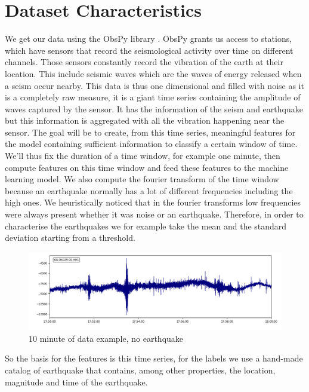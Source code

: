 \documentclass[10pt,conference,compsocconf]{IEEEtran}
\begin{document}
\section{Dataset Characteristics}
We get our data using the ObsPy library \cite{obspy}. ObsPy grants us access to stations, which have sensors that record the seismological activity over time on different channels. Those sensors constantly record  the vibration of the earth at their location. This include seismic waves which are the waves of energy released when a seism occur nearby. This data is thus one dimensional and filled with noise as it is a completely raw measure, it is a giant time series containing the amplitude of waves captured by the sensor. It has the information of the seism and earthquake but this information is aggregated with all the vibration happening near the sensor. The goal will be to create, from this time series, meaningful features for the model containing sufficient information to classify a certain window of time. We'll thus fix the duration of a time window, for example one minute, then compute features on this time window and feed these features to the machine learning model. We also compute the fourier transform of the time window because an earthquake normally has a lot of different frequencies including the high ones. We heuristically noticed that in the fourier transforms low frequencies were always present whether it was noise or an earthquake. Therefore, in order to characterise the earthquakes we for example take the mean and the standard deviation starting from a threshold.

\begin{figure}[h]
  \centering
	\includegraphics[width=\columnwidth]{10min-example-2018-06-30T17:50_1.png}
  \caption{$10$ minute of data example, no earthquake}
	\label{fig:10min-example}
\end{figure}

So the basis for the features is this time series, for the labels we use a hand-made catalog of earthquake that contains, among other properties, the location, magnitude and time of the earthquake.
\end{document}

